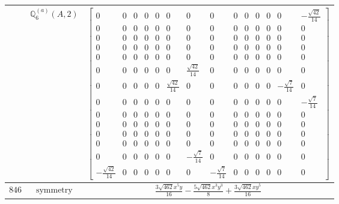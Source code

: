 \documentclass[fleqn,8pt,landscape]{jsarticle}
\begin{document}
\begin{longtable}{ccc}
$  $ & $ \mathbb{Q}_{6}^{(a)}(A,2) $ & $ \begin{bmatrix} 0 & 0 & 0 & 0 & 0 & 0 & 0 & 0 & 0 & 0 & 0 & 0 & 0 & - \frac{\sqrt{42}}{14} \\ 0 & 0 & 0 & 0 & 0 & 0 & 0 & 0 & 0 & 0 & 0 & 0 & 0 & 0 \\ 0 & 0 & 0 & 0 & 0 & 0 & 0 & 0 & 0 & 0 & 0 & 0 & 0 & 0 \\ 0 & 0 & 0 & 0 & 0 & 0 & 0 & 0 & 0 & 0 & 0 & 0 & 0 & 0 \\ 0 & 0 & 0 & 0 & 0 & 0 & 0 & 0 & 0 & 0 & 0 & 0 & 0 & 0 \\ 0 & 0 & 0 & 0 & 0 & 0 & \frac{\sqrt{42}}{14} & 0 & 0 & 0 & 0 & 0 & 0 & 0 \\ 0 & 0 & 0 & 0 & 0 & \frac{\sqrt{42}}{14} & 0 & 0 & 0 & 0 & 0 & 0 & - \frac{\sqrt{7}}{14} & 0 \\ 0 & 0 & 0 & 0 & 0 & 0 & 0 & 0 & 0 & 0 & 0 & 0 & 0 & - \frac{\sqrt{7}}{14} \\ 0 & 0 & 0 & 0 & 0 & 0 & 0 & 0 & 0 & 0 & 0 & 0 & 0 & 0 \\ 0 & 0 & 0 & 0 & 0 & 0 & 0 & 0 & 0 & 0 & 0 & 0 & 0 & 0 \\ 0 & 0 & 0 & 0 & 0 & 0 & 0 & 0 & 0 & 0 & 0 & 0 & 0 & 0 \\ 0 & 0 & 0 & 0 & 0 & 0 & 0 & 0 & 0 & 0 & 0 & 0 & 0 & 0 \\ 0 & 0 & 0 & 0 & 0 & 0 & - \frac{\sqrt{7}}{14} & 0 & 0 & 0 & 0 & 0 & 0 & 0 \\ - \frac{\sqrt{42}}{14} & 0 & 0 & 0 & 0 & 0 & 0 & - \frac{\sqrt{7}}{14} & 0 & 0 & 0 & 0 & 0 & 0 \end{bmatrix} $ \\ \hline
$ 846 $ & $ \text{symmetry} $ & $ \frac{3 \sqrt{462} x^{5} y}{16} - \frac{5 \sqrt{462} x^{3} y^{3}}{8} + \frac{3 \sqrt{462} x y^{5}}{16} $ \\

\end{longtable}
\end{document}
